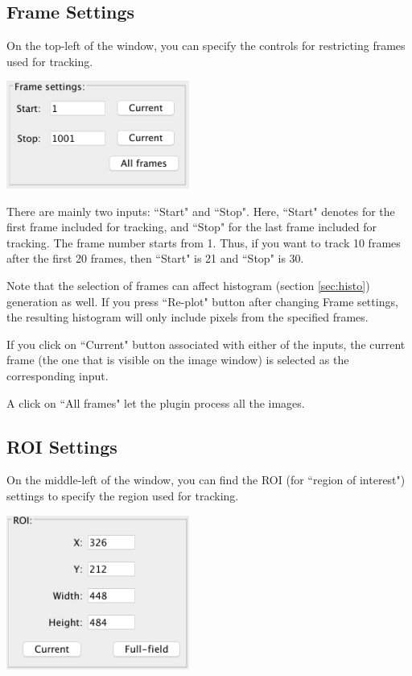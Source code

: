 \documentclass[a4paper,oneside,10pt]{article}
\newcommand{\secref}[1]{(section \ref{sec:#1})}
\begin{document}
\subsection{Frame Settings}
\label{sec:frame}
On the top-left of the window, you can specify the controls for restricting frames used for tracking.

\includegraphics[width=6cm]{frame.png}

There are mainly two inputs: ``Start" and ``Stop". Here, ``Start" denotes for the first frame included for tracking, and ``Stop" for the last frame included for tracking. The frame number starts from 1. Thus, if you want to track 10 frames after the first 20 frames, then ``Start" is 21 and ``Stop" is 30.

Note that the selection of frames can affect histogram \secref{histo} generation as well. If you press ``Re-plot" button after changing Frame settings, the resulting histogram will only include pixels from the specified frames.

If you click on ``Current" button associated with either of the inputs, the current frame (the one that is visible on the image window) is selected as the corresponding input.

A click on ``All frames" let the plugin process all the images.


\subsection{ROI Settings}
\label{sec:roi}
On the middle-left of the window, you can find the ROI (for ``region of interest") settings to specify the region used for tracking.

\includegraphics[width=6cm]{roi.png}
\end{document}
